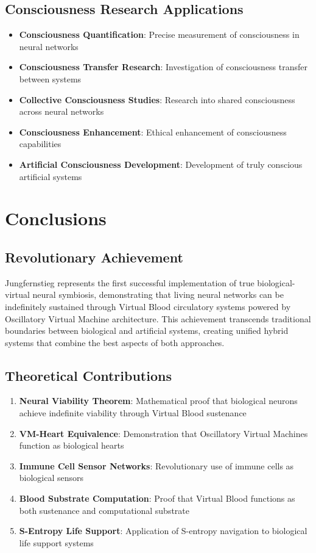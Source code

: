 \documentclass[12pt,a4paper]{article}
\begin{document}
\subsection{Consciousness Research Applications}

\begin{itemize}
\item \textbf{Consciousness Quantification}: Precise measurement of consciousness in neural networks
\item \textbf{Consciousness Transfer Research}: Investigation of consciousness transfer between systems
\item \textbf{Collective Consciousness Studies}: Research into shared consciousness across neural networks
\item \textbf{Consciousness Enhancement}: Ethical enhancement of consciousness capabilities
\item \textbf{Artificial Consciousness Development}: Development of truly conscious artificial systems
\end{itemize}

\section{Conclusions}

\subsection{Revolutionary Achievement}

Jungfernstieg represents the first successful implementation of true biological-virtual neural symbiosis, demonstrating that living neural networks can be indefinitely sustained through Virtual Blood circulatory systems powered by Oscillatory Virtual Machine architecture. This achievement transcends traditional boundaries between biological and artificial systems, creating unified hybrid systems that combine the best aspects of both approaches.

\subsection{Theoretical Contributions}

\begin{enumerate}
\item \textbf{Neural Viability Theorem}: Mathematical proof that biological neurons achieve indefinite viability through Virtual Blood sustenance
\item \textbf{VM-Heart Equivalence}: Demonstration that Oscillatory Virtual Machines function as biological hearts
\item \textbf{Immune Cell Sensor Networks}: Revolutionary use of immune cells as biological sensors
\item \textbf{Blood Substrate Computation}: Proof that Virtual Blood functions as both sustenance and computational substrate
\item \textbf{S-Entropy Life Support}: Application of S-entropy navigation to biological life support systems
\end{enumerate}
\end{document}
